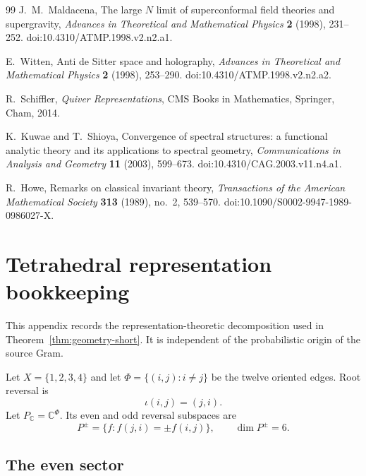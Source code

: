 \documentclass[11pt]{article}
\theoremstyle{definition}
\theoremstyle{remark}
\newcommand{\C}{\mathbb C}
\begin{document}
\begin{thebibliography}{99}
J.~M.~Maldacena,
\newblock The large $N$ limit of superconformal field theories and supergravity,
\newblock \emph{Advances in Theoretical and Mathematical Physics} \textbf{2}
(1998), 231--252.
\newblock doi:10.4310/ATMP.1998.v2.n2.a1.

E.~Witten,
\newblock Anti de Sitter space and holography,
\newblock \emph{Advances in Theoretical and Mathematical Physics} \textbf{2}
(1998), 253--290.
\newblock doi:10.4310/ATMP.1998.v2.n2.a2.

R.~Schiffler,
\newblock \emph{Quiver Representations},
\newblock CMS Books in Mathematics, Springer, Cham, 2014.

K.~Kuwae and T.~Shioya,
\newblock Convergence of spectral structures: a functional analytic theory and
its applications to spectral geometry,
\newblock \emph{Communications in Analysis and Geometry} \textbf{11} (2003),
599--673.
\newblock doi:10.4310/CAG.2003.v11.n4.a1.

R.~Howe,
\newblock Remarks on classical invariant theory,
\newblock \emph{Transactions of the American Mathematical Society}
\textbf{313} (1989), no.~2, 539--570.
\newblock doi:10.1090/S0002-9947-1989-0986027-X.

\end{thebibliography}

\clearpage
\appendix

\section{Tetrahedral representation bookkeeping}
\label{app:S4}

This appendix records the representation-theoretic decomposition used in
Theorem~\ref{thm:geometry-short}.  It is independent of the probabilistic
origin of the source Gram.

Let $X=\{1,2,3,4\}$ and let $\Phi=\{(i,j):i\ne j\}$ be the twelve oriented
edges.  Root reversal is
\[
\iota(i,j)=(j,i).
\]
Let $P_\C=\C^\Phi$.  Its even and odd reversal subspaces are
\[
P^\pm=\{f:f(j,i)=\pm f(i,j)\},
\qquad
\dim P^\pm=6.
\]

\subsection{The even sector}
\end{document}
